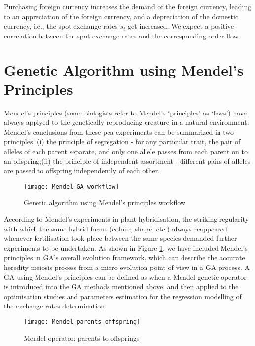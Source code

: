 Purchasing foreign currency increases the demand of the foreign
currency, leading to an appreciation of the foreign currency, and a
depreciation of the domestic currency, i.e., the spot exchange rates
$s_t$ get increased. We expect a positive correlation between the
spot exchange rates and the corresponding order flow.



\section{ Genetic Algorithm using Mendel's Principles  }
\label{Multi-objective Genetic Algorithm using Mendel's Principles}

Mendel's principles (some biologists refer to Mendel's `principles'
as `laws') have always applyed to the genetically reproducing
creature in a natural environment. Mendel's conclusions from these pea
experiments can be summarized in two principles \cite{Mendel1865,O'Neil2009,Marks2008}:(i) the principle of segregation - for any particular trait, the
pair of alleles of each parent separate, and only one allele passes
from each parent on to an offspring;(ii) the principle of independent assortment - different pairs of
alleles are passed to offspring independently of each other.
%

\begin{figure}[h!]
\centering
\texttt{[image: Mendel\_GA\_workflow]}
\caption{Genetic algorithm using Mendel's principles workflow}
\label{Mendel_GA_workflow}
\end{figure}

According to Mendel's experiments in plant hybridisation, the
striking regularity with which the same hybrid forms (colour, shape, etc.)
always reappeared whenever fertilisation took place between the same
species demanded further experiments to be undertaken. As shown in Figure \ref{Mendel_GA_workflow}, we have included Mendel's
principles in GA's overall evolution framework, which
can describe the accurate heredity meiosis process from a micro
evolution point of view in a GA process. A GA using Mendel's principles
can be defined as when a Mendel genetic operator is introduced into the GA
methods mentioned above, and then applied to the optimisation
studies and parameters estimation for the regression modelling of
the exchange rates determination.



\begin{figure}[h!]
\centering
\texttt{[image: Mendel\_parents\_offspring]}
\caption{Mendel operator: parents to offsprings }
\label{Mendel_parents_offspring}
\end{figure}


